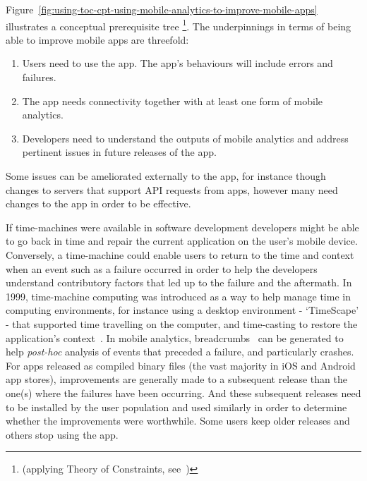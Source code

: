 Figure~\ref{fig:using-toc-cpt-using-mobile-analytics-to-improve-mobile-apps} illustrates a conceptual prerequisite tree \footnote{(applying Theory of Constraints, see~\citep{goldratt2017_necessary_but_not_sufficient, lepore1999_deming_and_goldratt, scheinkopf1999_thinking_for_a_change})}. 
%
The underpinnings in terms of being able to improve mobile apps are threefold: 
\begin{enumerate}
    \item Users need to use the app. The app's behaviours will include errors and failures.
    \item The app needs connectivity together with at least one form of mobile analytics.
    \item Developers need to understand the outputs of mobile analytics and address pertinent issues in future releases of the app.
\end{enumerate}

Some issues can be ameliorated externally to the app, for instance though changes to servers that support API requests from apps, however many need changes to the app in order to be effective. 

If time-machines were available in software development developers might be able to go back in time and repair the current application on the user's mobile device. Conversely, a time-machine could enable users to return to the time and context when an event such as a failure occurred in order to help the developers understand contributory factors that led up to the failure and the aftermath. In 1999, time-machine computing was introduced as a way to help manage time in computing environments, for instance using a desktop environment - `TimeScape' - that supported time travelling on the computer, and time-casting to restore the application's context~\citep{rekimoto1999_time_machine_computing}. In mobile analytics, breadcrumbs~\citep{MacLean2015_pro_android_5_book} can be generated to help \emph{post-hoc} analysis of events that preceded a failure, and particularly crashes. 
%
For apps released as compiled binary files (the vast majority in iOS and Android app stores), improvements are generally made to a subsequent release than the one(s) where the failures have been occurring. And these subsequent releases need to be installed by the user population and used similarly in order to determine whether the improvements were worthwhile. Some users keep older releases and others stop using the app. 




